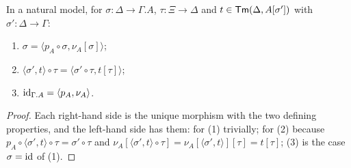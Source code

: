 \begin{lemma}\label{lem:pairing}
    In a natural model, for $\sigma : \Delta \to \Gamma.A$, $\tau : \Xi \to \Delta$ and $t \in \mathsf{Tm}(\Delta, A[\sigma'])$ with $\sigma' : \Delta \to \Gamma$:
    \begin{enumerate}
        \item $\sigma = \langle p_A \circ \sigma, \nu_A[\sigma] \rangle$;
        \item $\langle \sigma', t \rangle \circ \tau = \langle \sigma' \circ \tau, t[\tau] \rangle$;
        \item $\mathrm{id}_{\Gamma.A} = \langle p_A, \nu_A \rangle$.
    \end{enumerate}
\end{lemma}

\begin{proof}
    Each right-hand side is the unique morphism with the two defining properties, and the left-hand side has them: for (1) trivially; for (2) because $p_A \circ \langle \sigma', t \rangle \circ \tau = \sigma' \circ \tau$ and $\nu_A[\langle \sigma', t \rangle \circ \tau] = \nu_A[\langle \sigma', t \rangle][\tau] = t[\tau]$; (3) is the case $\sigma = \mathrm{id}$ of (1).
\end{proof}

